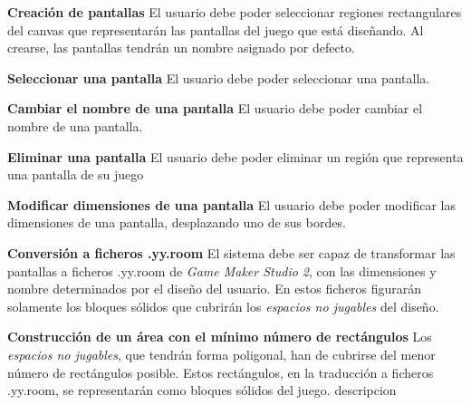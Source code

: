 \begin{functional}
	\item \textbf{Creación de pantallas}\newline
		El usuario debe poder seleccionar regiones rectangulares del canvas que representarán las pantallas del juego que está diseñando. Al crearse, las pantallas tendrán un nombre asignado por defecto.
	\item \textbf{Seleccionar una pantalla}\newline
		El usuario debe poder seleccionar una pantalla.
	\item \textbf{Cambiar el nombre de una pantalla}\newline
		El usuario debe poder cambiar el nombre de una pantalla.
	\item \textbf{Eliminar una pantalla}\newline
		El usuario debe poder eliminar un región que representa una pantalla de su juego
	\item \textbf{Modificar dimensiones de una pantalla}\newline
		El usuario debe poder modificar las dimensiones de una pantalla, desplazando uno de sus bordes.
	\item \textbf{Conversión a ficheros .yy.room}\newline
		El sistema debe ser capaz de transformar las pantallas a ficheros .yy.room de \textit{Game Maker Studio 2}, con las dimensiones y nombre determinados por el diseño del usuario. En estos ficheros figurarán solamente los bloques sólidos que cubrirán los \textit{espacios no jugables} del diseño.
		\begin{functional}
			\item \textbf{Construcción de un área con el mínimo número de rectángulos}\newline
				Los \textit{espacios no jugables}, que tendrán forma poligonal, han de cubrirse del menor número de rectángulos posible. Estos rectángulos, en la traducción a ficheros .yy.room, se representarán como bloques sólidos del juego.
			descripcion
		\end{functional}
\end{functional}